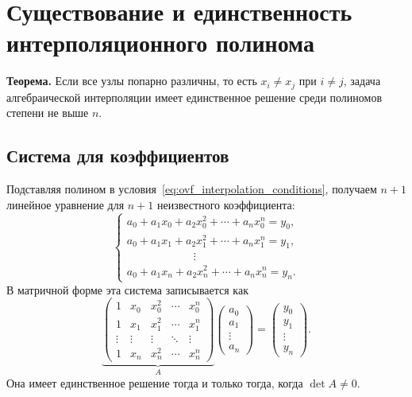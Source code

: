 \documentclass[../final.tex]{subfiles}
\begin{document}
\section{Существование и единственность интерполяционного полинома}

\textbf{Теорема.}
Если все узлы попарно различны, то есть
$x_i\ne x_j$ при $i\ne j$, задача алгебраической интерполяции
имеет единственное решение среди полиномов степени не выше $n$.

\subsection{Система для коэффициентов}

Подставляя полином в условия~\eqref{eq:ovf_interpolation_conditions},
получаем $n+1$ линейное уравнение для $n+1$ неизвестного коэффициента:
%
\begin{equation*}
    \begin{cases}
        a_0+a_1x_0+a_2x_0^2+\cdots+a_nx_0^n=y_0,\\
        a_0+a_1x_1+a_2x_1^2+\cdots+a_nx_1^n=y_1,\\
        \hspace{6em}\vdots\\
        a_0+a_1x_n+a_2x_n^2+\cdots+a_nx_n^n=y_n.
    \end{cases}
\end{equation*}
%
В матричной форме эта система записывается как
%
\begin{equation*}
    \underbrace{
    \begin{pmatrix}
        1&x_0&x_0^2&\cdots&x_0^n\\
        1&x_1&x_1^2&\cdots&x_1^n\\
        \vdots&\vdots&\vdots&\ddots&\vdots\\
        1&x_n&x_n^2&\cdots&x_n^n
    \end{pmatrix}}_{A}
    \begin{pmatrix}a_0\\a_1\\\vdots\\a_n\end{pmatrix}
    =\begin{pmatrix}y_0\\y_1\\\vdots\\y_n\end{pmatrix}.
\end{equation*}
%
Она имеет единственное решение тогда и только тогда, когда $\det A\ne0$.
\end{document}
